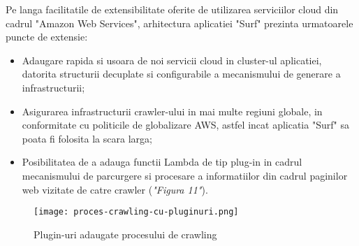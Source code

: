 Pe langa facilitatile de extensibilitate oferite de utilizarea serviciilor cloud din cadrul "Amazon Web Services", arhitectura aplicatiei "Surf" prezinta urmatoarele puncte de extensie:

\begin{itemize}
	\item{Adaugare rapida si usoara de noi servicii cloud in cluster-ul aplicatiei, datorita structurii decuplate si configurabile a mecanismului de generare a infrastructurii;}
	\item{Asigurarea infrastructurii crawler-ului in mai multe regiuni globale, in conformitate cu politicile de globalizare AWS, astfel incat aplicatia "Surf" sa poata fi folosita la scara larga;}
	\item{Posibilitatea de a adauga functii Lambda de tip plug-in in cadrul mecanismului de parcurgere si procesare a informatiilor din cadrul paginilor web vizitate de catre crawler (\textit{"Figura 11"}).}
\end{itemize}

\begin{figure}[ht]
\begin{center}
	\texttt{[image: proces-crawling-cu-pluginuri.png]}
	\caption{Plugin-uri adaugate procesului de crawling \cite{diagram-icons-sources, aws-icons-source}}\par\medskip 

\end{center}
\end{figure}